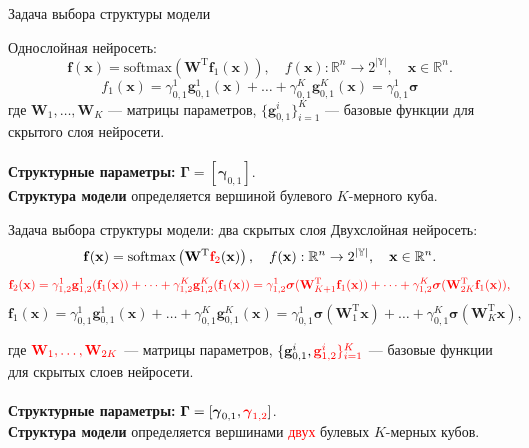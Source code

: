 \documentclass[usenames,dvipsnames,11pt,pdf,utf8,russian,aspectratio=169]{beamer}
\begin{document}
\begin{frame}{Задача выбора структуры модели}

Однослойная нейросеть:
\[
    \mathbf{f}(\mathbf{x}) = \text{softmax}\left(\mathbf{W}^\text{T}\mathbf{f}_1(\mathbf{x})\right), \quad f(\mathbf{x}): \mathbb{R}^n \to 2^{|\mathbb{Y}|}, \quad \mathbf{x} \in \mathbb{R}^n.
\]
\[
\]
\[
{f}_1(\mathbf{x}) = {\gamma}_{0,1}^{1}\mathbf{g}_{0,1}^{1}(\mathbf{x})+\dots+{\gamma}_{0,1}^{K}\mathbf{g}_{0,1}^{K}(\mathbf{x})= {\gamma}_{0,1}^{1}\boldsymbol{\sigma}%
\]
где $\mathbf{W}_1, \dots, \mathbf{W}_K$ --- матрицы параметров, $\{\mathbf{g}^{i}_{0,1}\}_{i=1}^K$ --- базовые функции для скрытого слоя нейросети.~\\~\\

\textbf{Структурные параметры:}  $\boldsymbol{\Gamma} = [\boldsymbol{\gamma}_{0,1}]$.\\
\textbf{Структура модели} определяется вершиной булевого $K$-мерного куба.

\end{frame}

\begin{frame}{Задача выбора структуры модели: два скрытых слоя}
Двухслойная нейросеть:
\[
    \mathbf{f}(\mathbf{x}) = \text{softmax}\left(\mathbf{W}^\text{T}\textcolor{red}{\mathbf{f}_2}(\mathbf{x})\right), \quad f(\mathbf{x}): \mathbb{R}^n \to 2^{|\mathbb{Y}|}, \quad \mathbf{x} \in \mathbb{R}^n.
\]
\[
\textcolor{red}{
\mathbf{f}_2(\mathbf{x}) = {\gamma}_{1,2}^{1}\mathbf{g}_{1,2}^{1}(\mathbf{f}_1(\mathbf{x}))+\dots+{\gamma}_{1,2}^{K}\mathbf{g}_{1,2}^{K}(\mathbf{f}_1(\mathbf{x}))= {\gamma}_{1,2}^{1}\boldsymbol{\sigma}(\mathbf{W}_{K+1}^\text{T}\mathbf{f}_1(\mathbf{x})) + \dots +  {\gamma}_{1,2}^{K}\boldsymbol{\sigma}(\mathbf{W}_{2K}^\text{T}\mathbf{f}_1(\mathbf{x})),}
\]
\[
\mathbf{f}_1(\mathbf{x}) = {\gamma}_{0,1}^{1}\mathbf{g}_{0,1}^{1}(\mathbf{x})+\dots+{\gamma}_{0,1}^{K}\mathbf{g}_{0,1}^{K}(\mathbf{x})= {\gamma}_{0,1}^{1}\boldsymbol{\sigma}(\mathbf{W}_1^\text{T}\mathbf{x}) + \dots +  {\gamma}_{0,1}^{K}\boldsymbol{\sigma}(\mathbf{W}_K^\text{T}\mathbf{x}),
\]

где $\textcolor{red}{\mathbf{W}_1, \dots, \mathbf{W}_{2K}}$ --- матрицы параметров, $\{\mathbf{g}^{i}_{0,1}, \textcolor{red}{\mathbf{g}^{i}_{1,2}\}_{i=1}^K}$ --- базовые функции для скрытых слоев нейросети.~\\~\\

\textbf{Структурные параметры:} $\boldsymbol{\Gamma} = [\boldsymbol{\gamma}_{0,1}, \textcolor{red}{\boldsymbol{\gamma}_{1,2}}]$.\\
\textbf{Структура модели} определяется вершинами \textcolor{red}{двух} булевых $K$-мерных кубов.
\end{frame}
        
\end{document}
